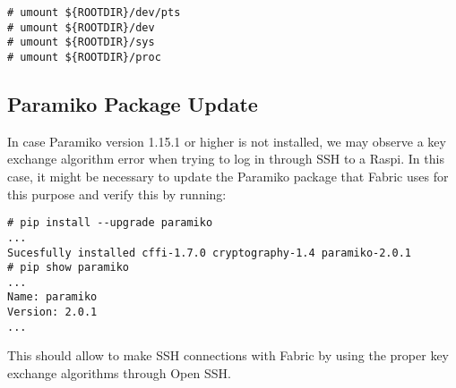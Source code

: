 \begin{lstlisting}[]
# umount ${ROOTDIR}/dev/pts
# umount ${ROOTDIR}/dev
# umount ${ROOTDIR}/sys
# umount ${ROOTDIR}/proc
\end{lstlisting}
\FloatBarrier
\vspace{-5mm}

\subsection{Paramiko Package Update}
\label{sec:paramiko}
In case Paramiko version 1.15.1 or higher is not installed, we may observe
a key exchange algorithm error when trying to log in through \ac{SSH} to a
Raspi. In this case, it might be necessary to update the Paramiko package
that Fabric uses for this purpose and verify this by running:

\begin{lstlisting}[]
# pip install --upgrade paramiko
...
Sucesfully installed cffi-1.7.0 cryptography-1.4 paramiko-2.0.1
# pip show paramiko
...
Name: paramiko
Version: 2.0.1
...
\end{lstlisting}
\FloatBarrier
\vspace{-5mm}

This should allow to make \ac{SSH} connections with Fabric by using the proper
key exchange algorithms through Open SSH.